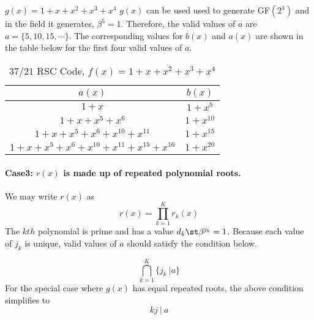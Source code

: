 \begin{example}
$g(x)=1+x+x^2+x^3+x^4$\newline
$g(x)$ can be used used to generate GF$(2^4)$ and in the field it generates, $\beta^{5}=1$. Therefore, the valid values of $a$ are $a=\{5,10,15,\cdots\}$. The corresponding values for $b(x)$ and $a(x)$ are shown in the table below for the first four valid values of $a$.

\begin{table*}[h]
 \caption{$37/21$ RSC Code, $f(x)=1+x+x^2+x^3+x^4$}
\centering
 \begin{tabular}{c c} 
 \hline
 $a(x)$ & $b(x)$  \\ [0.5ex] 
 \hline\hline
$1+x$ &$1+x^5$\\ 
$1+x+x^5+x^6$ &$1+x^{10}$  \\
$1+x+x^5+x^6+x^{10}+x^{11}$ & $1+x^{15}$ \\
$1+x+x^5+x^6+x^{10}+x^{11}+x^{15}+x^{16}$ &$1+x^{20}$  
 \end{tabular}
 \label{novelTab3}
\end{table*}
\end{example}


\paragraph{Case3: $r(x)$ is made up of repeated polynomial roots. \newline}
We may write $r(x)$ as $$r(x)=\prod_{k=1}^{K}r_k(x)$$ The $kth$ polynomial is prime and has a value $d_k \st \beta^{j_k}=1$. Because each value of $j_k$ is unique, valid values of $a$ should satisfy the condition below. 

$$ \bigcap_{k=1}^{K} \{j_k~| a\}$$
For the special case where $g(x)$ has equal repeated roots, the above condition simplifies to 
$$kj ~| ~a$$

